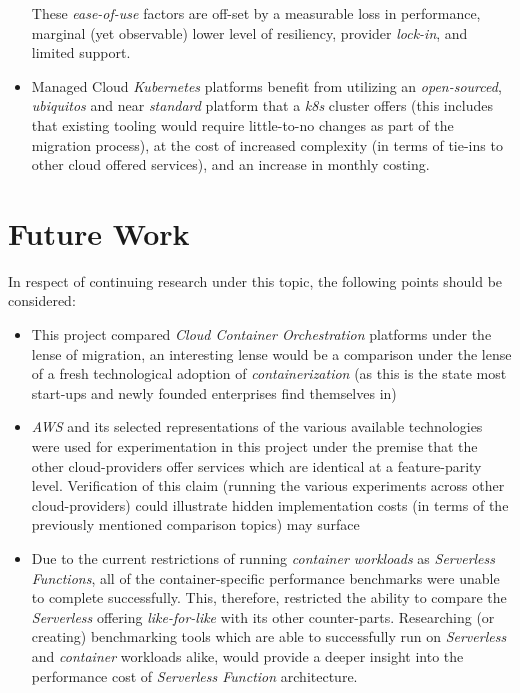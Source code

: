 \begin{itemize}
            These \emph{ease-of-use} factors are off-set by a measurable loss in performance, marginal (yet observable) lower level of resiliency, provider \textit{lock-in},
            and limited support.
      \item Managed Cloud \textit{Kubernetes} platforms benefit from utilizing an \textit{open-sourced}, \emph{ubiquitos} and near \textit{standard} platform
            that a \textit{k8s} cluster offers (this includes that existing tooling would require little-to-no changes as part of the migration process),
            at the cost of increased complexity (in terms of tie-ins to other cloud offered services), and an increase in monthly costing.
\end{itemize}

\chapter{Future Work}
In respect of continuing research under this topic, the following points should be considered:
\begin{itemize}
      \item This project compared \emph{Cloud Container Orchestration} platforms under the lense of migration,
            an interesting lense would be a comparison under the lense of a fresh technological adoption of \textit{containerization}
            (as this is the state most start-ups and newly founded enterprises find themselves in)
      \item \textit{AWS} and its selected representations of the various available technologies were used for experimentation in this project
            under the premise that the other cloud-providers offer services which are identical at a feature-parity level.
            Verification of this claim (running the various experiments across other cloud-providers) could illustrate hidden implementation costs
            (in terms of the previously mentioned comparison topics) may surface
      \item Due to the current restrictions of running \textit{container workloads} as \textit{Serverless Functions},
            all of the container-specific performance benchmarks were unable to complete successfully.
            This, therefore, restricted the ability to compare the \textit{Serverless} offering \emph{like-for-like} with its other counter-parts.
            Researching (or creating) benchmarking tools which are able to successfully run on \textit{Serverless} and \textit{container} workloads alike,
            would provide a deeper insight into the performance cost of \textit{Serverless Function} architecture.
\end{itemize}
